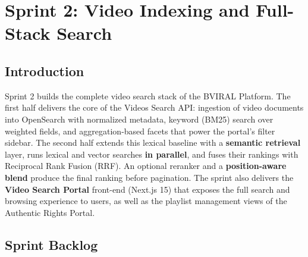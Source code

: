 \chapter{Sprint 2: Video Indexing and Full-Stack Search}

\section*{Introduction}

Sprint 2 builds the complete video search stack of the BVIRAL Platform. The first half delivers
the core of the Videos Search API: ingestion of video documents into OpenSearch with normalized
metadata, keyword (BM25) search over weighted fields, and aggregation-based facets that power the
portal's filter sidebar. The second half extends this lexical baseline with a \textbf{semantic
retrieval} layer, runs lexical and vector searches \textbf{in parallel}, and fuses their rankings
with Reciprocal Rank Fusion (RRF). An optional reranker and a \textbf{position-aware blend}
produce the final ranking before pagination. The sprint also delivers the \textbf{Video Search
Portal} front-end (Next.js 15) that exposes the full search and browsing experience to users,
as well as the playlist management views of the Authentic Rights Portal.

\section{Sprint Backlog}

